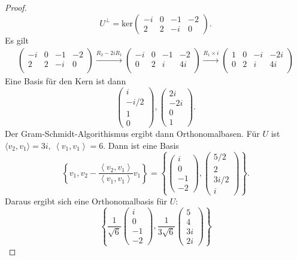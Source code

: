 \begin{proof}
	\[
		U^\perp=\text{ker}\begin{pmatrix} -i & 0 & -1 & -2 \\ 2 & 2 & -i &0 \end{pmatrix} 
	.\] 
Es gilt
\begin{gather*}
\left(
\begin{array}{cccc}
 -i & 0 & -1 & -2 \\
 2 & 2 & -i & 0 \\
\end{array}
\right) \xrightarrow{R_2-2iR_1} \left(
\begin{array}{cccc}
 -i & 0 & -1 & -2 \\
 0 & 2 & i & 4 i \\
\end{array}
\right) \xrightarrow{R_1\times i} \left(
\begin{array}{cccc}
 1 & 0 & -i & -2 i \\
 0 & 2 & i & 4 i \\
\end{array}
\right)	
\end{gather*}
Eine Basis f\"{u}r den Kern ist dann
\[
\begin{pmatrix} i \\ -i / 2 \\ 1 \\ 0 \end{pmatrix} , \begin{pmatrix}  2i \\ -2i \\ 0 \\ 1\end{pmatrix} 
.\] 
Der Gram-Schmidt-Algorithismus ergibt dann Orthonomalbasen. F\"{u}r $U$ ist $\langle v_2,v_1\rangle=3i,~\left<v_1,v_1 \right> = 6$. Dann ist eine Basis
\[
	\left\{	v_1,v_2-\frac{\left<v_2,v_1 \right>}{\left<v_1,v_1 \right>}v_1\right\}=\left\{ \begin{pmatrix} i \\ 0 \\ -1 \\ -2 \end{pmatrix} , \begin{pmatrix} 5 / 2 \\ 2 \\ 3i / 2 \\ i \end{pmatrix}  \right\} 
.\] 
Daraus ergibt sich eine Orthonomalbasis f\"{u}r $U$:
\[
\left\{ \frac{1}{\sqrt{6} }\begin{pmatrix} i \\ 0 \\ -1 \\ -2 \end{pmatrix} , \frac{1}{3\sqrt{6} }\begin{pmatrix} 5 \\ 4 \\ 3i \\ 2i \end{pmatrix}  \right\} 
\]
\end{proof}
